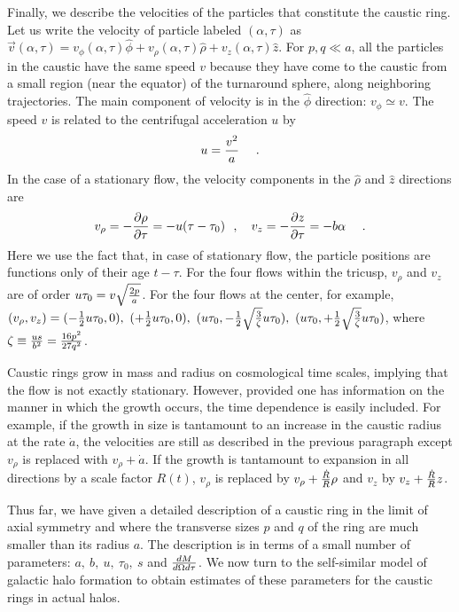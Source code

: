 \documentclass[aps,prd,preprint,tightenlines,floatfix,showpacs,groupedaddress]{revtex4}
\begin{document}
Finally, we describe the velocities of the particles that constitute
the caustic ring.  Let us write the velocity of particle labeled
$(\alpha, \tau)$ as  $\vec{v}(\alpha, \tau) = 
v_\phi (\alpha, \tau) \hat{\phi} + v_\rho (\alpha, \tau) \hat{\rho}
+ v_z (\alpha, \tau) \hat{z}$.  For $p,q \ll a$, all the particles 
in the caustic have the same speed $v$ because they have come to 
the caustic from a small region (near the equator) of the turnaround
sphere, along neighboring trajectories.  The main component of velocity 
is in the $\hat{\phi}$ direction: $v_\phi \simeq v$.  The speed $v$ is 
related to the centrifugal acceleration $u$ by 
\begin{equation}
u = {v^2 \over a}~~~\ .
\label{ca}
\end{equation}
In the case of a stationary flow, the velocity components in the 
$\hat{\rho}$ and $\hat{z}$ directions are 
\begin{equation}
v_\rho = - {\partial \rho \over \partial \tau} = - u (\tau - \tau_0)~~,~~~
v_z = - {\partial z \over \partial \tau} = - b \alpha~~~\ .
\label{tranvel}
\end{equation}
Here we use the fact that, in case of stationary flow, the 
particle positions are functions only of their age $t - \tau$.
For the four flows within the tricusp, $v_\rho$ and $v_z$ are of 
order $u \tau_0 = v \sqrt{2p \over a}$.  For the four flows at 
the center, for example, $(v_\rho, v_z) = 
(-{1 \over 2} u \tau_0, 0),~(+{1 \over 2} u \tau_0, 0),~
(u \tau_0, - {1 \over 2} \sqrt{3 \over \zeta} u \tau_0),~
(u \tau_0, + {1 \over 2} \sqrt{3 \over \zeta} u \tau_0)$, 
where $\zeta \equiv {us \over b^2} = {16 p^2 \over 27 q^2}$.

Caustic rings grow in mass and radius on cosmological time scales, 
implying that the flow is not exactly stationary.  However, provided 
one has information on the manner in which the growth occurs, the 
time dependence is easily included.  For example, if the growth in 
size is tantamount to an increase in the caustic radius at the rate 
$\dot{a}$, the velocities are still as described in the previous 
paragraph except $v_\rho$ is replaced with $v_\rho + \dot{a}$.  If 
the growth is tantamount to expansion in all directions by a scale 
factor $R(t)$, $v_\rho$ is replaced by  $v_\rho + {\dot{R} \over R} \rho$ 
and $v_z$ by $v_z + {\dot{R} \over R} z$.

Thus far, we have given a detailed description of a caustic 
ring in the limit of axial symmetry and where the transverse
sizes $p$ and $q$ of the ring are much smaller than its radius 
$a$.  The description is in terms of a small number of parameters:
$a,~b,~u,~\tau_0,~s$ and ${dM \over d\Omega d\tau}$.  We now 
turn to the self-similar model of galactic halo formation 
to obtain estimates of these parameters for the caustic 
rings in actual halos.
\end{document}

